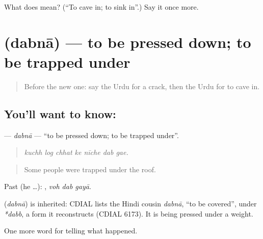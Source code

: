 \begin{tcolorbox}[breakable,colback=teal!4,colframe=teal!35!black,title={Before you move on}]
What does  mean? (\textquotedblleft{}To cave in; to sink in\textquotedblright{}.) Say it once more.
\end{tcolorbox}
\section[\texorpdfstring{\ur{دبنا} (dabnā)}{دبنا (dabnā)}]{ (dabnā) — to be pressed down; to be trapped under}

\label{lesson:UR-C291-dabna}



\begin{quote}
Before the new one: say the Urdu for a crack, then the Urdu for to cave in.
\end{quote}

\subsection*{You'll want to know: }
\textbf{} — \emph{dabnā} — \textquotedblleft{}to be pressed down; to be trapped under\textquotedblright{}.

\begin{quote}
      
\end{quote}

\begin{quote}
\emph{kuchh log chhat ke nīche dab gae.}
\end{quote}

\begin{quote}
Some people were trapped under the roof.
\end{quote}

Past (he …):   , \emph{voh dab gayā}.

\begin{cousinweb}
\textbf{} (\emph{dabnā}) is inherited: CDIAL lists the Hindi cousin \emph{dabnā}, \textquotedblleft{}to be covered\textquotedblright{}, under \emph{*dabb}, a form it reconstructs (CDIAL 6173). It is being pressed under a weight.
\end{cousinweb}

\begin{grammarlens}[title={What you've built}]
One more word for telling what happened.
\end{grammarlens}


